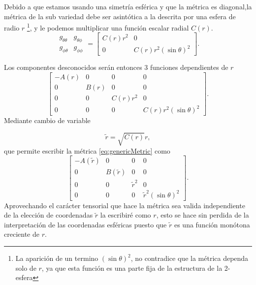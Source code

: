 


Debido a que estamos usando una simetría esférica y que la métrica es diagonal,la métrica de la sub variedad debe ser asintótica a la descrita por una esfera de radio $r$ \footnote{La aparición de un termino $(\sin \theta)^2$, no contradice que la métrica dependa solo de $r$, ya que esta función es una parte fija de la estructura de la 2-esfera}, y le podemos multiplicar una función  escalar radial $C(r)$.
\begin{equation}
    \begin{array}{ll}
        g_{\theta \theta} & g_{\theta \phi} \\
        g_{\phi \theta}   & g_{\phi \phi}
    \end{array} = \left[\begin{array}{cc}
            C(r) r^2 & 0                       \\
            0        & C(r) r^2(\sin \theta)^2
        \end{array}\right].
\end{equation}


Los componentes desconocidos serán entonces 3 funciones dependientes de $r$
\begin{equation}
    \left[\begin{array}{cccc}
            -A(r) & 0    & 0        & 0                       \\
            0     & B(r) & 0        & 0                       \\
            0     & 0    & C(r) r^2 & 0                       \\
            0     & 0    & 0        & C(r) r^2(\sin \theta)^2
        \end{array}\right].
    \label{eq:genericMetric}
\end{equation}
Mediante cambio de variable

\begin{equation}
    \tilde{r}=\sqrt{C(r)}  r,
\end{equation}
que permite escribir la métrica \ref{eq:genericMetric} como
\begin{equation}
    \left[\begin{array}{cccc}
            -A(\tilde{r}) & 0            & 0           & 0                          \\
            0             & B(\tilde{r}) & 0           & 0                          \\
            0             & 0            & \tilde{r}^2 & 0                          \\
            0             & 0            & 0           & \tilde{r}^2(\sin \theta)^2
        \end{array}\right].
    \label{eq:genericmetric2}
\end{equation}
Aprovechando el carácter tensorial que hace la métrica sea valida independiente de la elección de coordenadas  $\tilde{r}$ la escribiré como $r$, esto se hace sin perdida de la interpretación de las coordenadas esféricas puesto que $\tilde{r}$ es una función monótona creciente de $r$.


